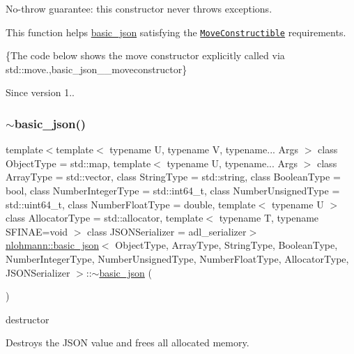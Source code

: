 No-\/throw guarantee\+: this constructor never throws exceptions.

This function helps {\ttfamily \mbox{\hyperlink{classnlohmann_1_1basic__json}{basic\+\_\+json}}} satisfying the \href{http://en.cppreference.com/w/cpp/concept/MoveConstructible}{\tt Move\+Constructible} requirements.

\{The code below shows the move constructor explicitly called via std\+::move.,basic\+\_\+json\+\_\+\+\_\+moveconstructor\}

\begin{DoxySince}{Since}
version 1.. 
\end{DoxySince}
\mbox{\label{classnlohmann_1_1basic__json_a42347bbce75ba5571e292a3540af30e0}} 
\subsubsection{\texorpdfstring{$\sim$basic\+\_\+json()}{~basic\_json()}}
{\footnotesize\ttfamily template$<$template$<$ typename U, typename V, typename... Args $>$ class Object\+Type = std\+::map, template$<$ typename U, typename... Args $>$ class Array\+Type = std\+::vector, class String\+Type  = std\+::string, class Boolean\+Type  = bool, class Number\+Integer\+Type  = std\+::int64\+\_\+t, class Number\+Unsigned\+Type  = std\+::uint64\+\_\+t, class Number\+Float\+Type  = double, template$<$ typename U $>$ class Allocator\+Type = std\+::allocator, template$<$ typename T, typename S\+F\+I\+N\+A\+E=void $>$ class J\+S\+O\+N\+Serializer = adl\+\_\+serializer$>$ \\
\mbox{\hyperlink{classnlohmann_1_1basic__json}{nlohmann\+::basic\+\_\+json}}$<$ Object\+Type, Array\+Type, String\+Type, Boolean\+Type, Number\+Integer\+Type, Number\+Unsigned\+Type, Number\+Float\+Type, Allocator\+Type, J\+S\+O\+N\+Serializer $>$\+::$\sim$\mbox{\hyperlink{classnlohmann_1_1basic__json}{basic\+\_\+json}} (\begin{DoxyParamCaption}{ }\end{DoxyParamCaption})\hspace{0.3cm}{\ttfamily [inline]}}



destructor 

Destroys the J\+S\+ON value and frees all allocated memory.

